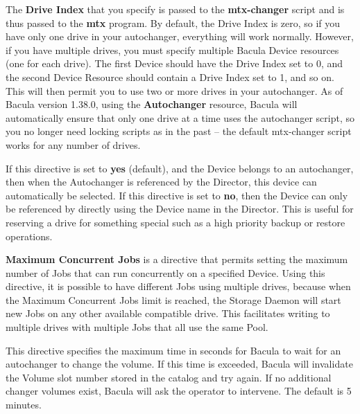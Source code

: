 \begin{description}
\begin{verbatim}
\end{verbatim}
\normalsize

\item [Drive Index = {\it number}]
   The {\bf Drive Index} that you specify is passed to the {\bf
   mtx-changer} script and is thus passed to the {\bf mtx} program.  By
   default, the Drive Index is zero, so if you have only one drive in your
   autochanger, everything will work normally.  However, if you have
   multiple drives, you must specify multiple Bacula Device resources (one
   for each drive).  The first Device should have the Drive Index set to 0,
   and the second Device Resource should contain a Drive Index set to 1,
   and so on.  This will then permit you to use two or more drives in your
   autochanger.  As of Bacula version 1.38.0, using the {\bf Autochanger}
   resource, Bacula will automatically ensure that only one drive at a time
   uses the autochanger script, so you no longer need locking scripts as in
   the past -- the default mtx-changer script works for any number of
   drives.

\item [Autoselect = {\it yes\vb{}no}]
   If this directive is set to {\bf yes} (default), and the Device
   belongs to an autochanger, then when the Autochanger is referenced
   by the Director, this device can automatically be selected. If this
   directive is set to {\bf no}, then the Device can only be referenced
   by directly using the Device name in the Director. This is useful
   for reserving a drive for something special such as a high priority
   backup or restore operations.

\item[Maximum Concurrent Jobs = {\it num}]

{\bf Maximum Concurrent Jobs} is a directive that permits setting the maximum
number of Jobs that can run concurrently on a specified Device.  Using this
directive, it is possible to have different Jobs using multiple drives, because
when the Maximum Concurrent Jobs limit is reached, the Storage Daemon will
start new Jobs on any other available compatible drive.  This facilitates
writing to multiple drives with multiple Jobs that all use the same Pool.

\item [Maximum Changer Wait = {\it time}]
   This directive specifies the maximum time in seconds for Bacula to wait
   for an autochanger to change the volume.  If this time is exceeded,
   Bacula will invalidate the Volume slot number stored in the catalog and
   try again.  If no additional changer volumes exist, Bacula will ask the
   operator to intervene.  The default is 5 minutes.      


\end{description}
